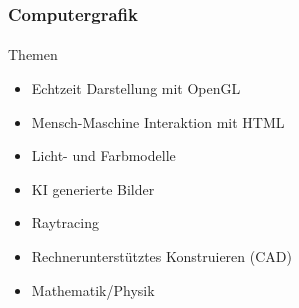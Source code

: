 \documentclass{beamer}
\begin{document}
\begin{frame}
    \frametitle{Computergrafik}
\framesubtitle{}
    \begin{block}{Themen}
\begin{itemize}
\item Echtzeit Darstellung mit OpenGL
\item Mensch-Maschine Interaktion mit HTML
\item Licht- und Farbmodelle
\item KI generierte Bilder
\item Raytracing
\item Rechnerunterstütztes Konstruieren (CAD)
\item Mathematik/Physik
\end{itemize}
\end{block}

\end{frame}
\end{document}
